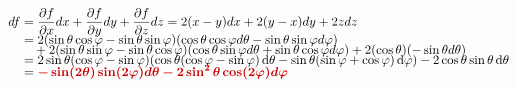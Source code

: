 \documentclass[a4paper,12pt]{article}
\newcommand{\formu}[1]{\textcolor{formulacolor}{\bm{#1}}}
\newcommand{\sol}[1]{\textcolor{examplecolor}{#1}}
\renewcommand{\d}{\mathop{}\!\mathrm{d}}
\begin{document}
\sol{${\setlength{\jot}{-4pt}\begin{aligned}[t]
    df &= \frac{\partial f}{\partial x} dx + \frac{\partial f}{\partial y} dy + \frac{\partial f}{\partial z} dz = 2(x-y) dx + 2(y-x) dy + 2z dz \\
    &= 2(\sin\theta\cos\varphi - \sin\theta\sin\varphi)(\cos\theta\cos\varphi d\theta - \sin\theta\sin\varphi d\varphi) \\
    &\;\;\;\,+ 2(\sin\theta\sin\varphi - \sin\theta\cos\varphi)(\cos\theta\sin\varphi d\theta + \sin\theta\cos\varphi d\varphi) + 2(\cos\theta)(-\sin\theta d\theta) \\
    &=2\sin\theta(\cos\varphi-\sin\varphi)(\cos\theta(\cos\varphi-\sin\varphi)\d\theta-\sin\theta(\sin\varphi+\cos\varphi)\d\varphi)-2\cos\theta\sin\theta\d\theta \\
    &= \formu{-\sin(2\theta)\sin(2\varphi) d\theta - 2\sin^2\theta\cos(2\varphi) d\varphi}
\end{aligned}}$}
\end{document}
